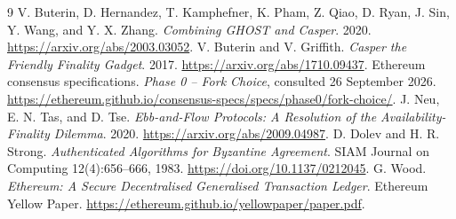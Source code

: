 \documentclass[11pt,a4paper,onecolumn]{article}
\theoremstyle{remark}\newtheorem{example}[definition]{Example}
\begin{document}
\begin{thebibliography}{9}\small
\setlength{\itemsep}{2pt}
 V. Buterin, D. Hernandez, T. Kamphefner, K. Pham,
Z. Qiao, D. Ryan, J. Sin, Y. Wang, and Y. X. Zhang.
\emph{Combining GHOST and Casper}. 2020.
\url{https://arxiv.org/abs/2003.03052}.
 V. Buterin and V. Griffith.
\emph{Casper the Friendly Finality Gadget}. 2017.
\url{https://arxiv.org/abs/1710.09437}.
 Ethereum consensus specifications.
\emph{Phase 0 -- Fork Choice}, consulted 26 September 2026.
\url{https://ethereum.github.io/consensus-specs/specs/phase0/fork-choice/}.
 J. Neu, E. N. Tas, and D. Tse.
\emph{Ebb-and-Flow Protocols: A Resolution of the Availability-Finality Dilemma}.
2020. \url{https://arxiv.org/abs/2009.04987}.
 D. Dolev and H. R. Strong.
\emph{Authenticated Algorithms for Byzantine Agreement}.
SIAM Journal on Computing 12(4):656--666, 1983.
\url{https://doi.org/10.1137/0212045}.
 G. Wood.
\emph{Ethereum: A Secure Decentralised Generalised Transaction Ledger}.
Ethereum Yellow Paper. \url{https://ethereum.github.io/yellowpaper/paper.pdf}.
\end{thebibliography}
\end{document}
